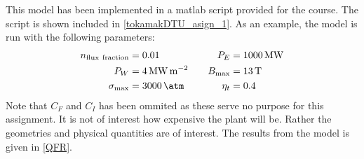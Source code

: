 This model has been implemented in a matlab script provided for the course. The script is shown included in \cref{tokamakDTU_asign_1}.
As an example, the model is run with the following parameters:
\begin{alignat}{3}
	n_\mathrm{flux \ fraction} & = 0.01                                 & \quad P_E      & = \SI{1000}{\mega\watt} \nonumber       \\
	P_W                        & = \SI{4}{\mega\watt\per\meter\squared} & \quad B_{\max} & = \SI{13}{\tesla}    \label{Inputparam} \\
	\sigma_{\max}              & = \SI{3000}{\atm}                      & \quad \eta_t   & = 0.4 \nonumber
\end{alignat}
Note that \(C_F\) and \(C_I\) has been ommited as these serve no purpose for this assignment. It is not of interest how expensive the plant will be. Rather the geometries and physical quantities are of interest.
The results from the model is given in \cref{QFR}.
